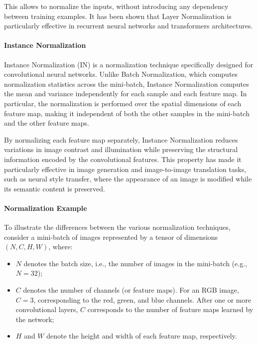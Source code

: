 This allows to normalize the inputs, without introducing any dependency between training examples. 
It has been shown that Layer Normalization is particularly effective in recurrent neural networks and transformers architectures.


\paragraph{Instance Normalization}
Instance Normalization (IN) is a normalization technique specifically designed for convolutional neural networks. Unlike Batch Normalization, which computes normalization statistics across the mini-batch, Instance Normalization computes the mean and variance independently for each sample and each feature map. In particular, the normalization is performed over the spatial dimensions of each feature map, making it independent of both the other samples in the mini-batch and the other feature maps.

By normalizing each feature map separately, Instance Normalization reduces variations in image contrast and illumination while preserving the structural information encoded by the convolutional features. This property has made it particularly effective in image generation and image-to-image translation tasks, such as neural style transfer, where the appearance of an image is modified while its semantic content is preserved.

\paragraph{Normalization Example}
To illustrate the differences between the various normalization techniques, consider a mini-batch of images represented by a tensor of dimensions $(N, C, H, W)$, where:
\begin{itemize}
    \item $N$ denotes the batch size, i.e., the number of images in the mini-batch (e.g., $N = 32$);
    \item $C$ denotes the number of channels (or feature maps). For an RGB image, $C = 3$, corresponding to the red, green, and blue channels. 
    After one or more convolutional layers, $C$ corresponds to the number of feature maps learned by the network;
    \item $H$ and $W$ denote the height and width of each feature map, respectively.
\end{itemize}

